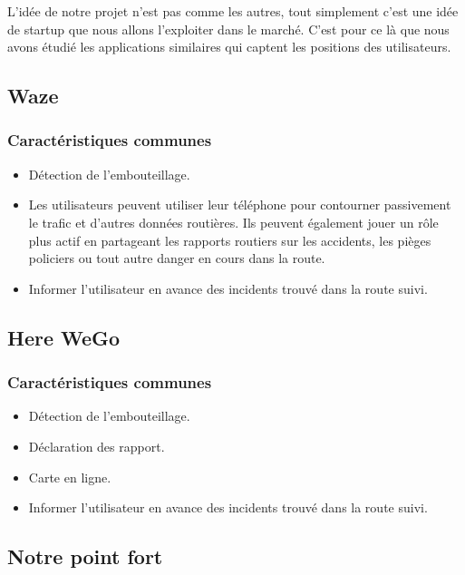 L'idée de notre projet n'est pas comme les autres, tout simplement c'est une
idée de startup que nous allons l'exploiter dans le marché. C'est pour ce là
que nous avons étudié les applications similaires qui captent les positions des
utilisateurs.

\subsection{Waze}

\subsubsection{Caractéristiques communes}

\begin{itemize}
    \item Détection de l'embouteillage.
    \item Les utilisateurs peuvent utiliser leur téléphone pour contourner
        passivement le trafic et d'autres données routières. Ils peuvent
        également jouer un rôle plus actif en partageant les rapports routiers
        sur les accidents, les pièges policiers ou tout autre danger en cours
        dans la route.
    \item Informer l'utilisateur en avance des incidents trouvé dans la route
        suivi.
\end{itemize}

\subsection{Here WeGo}

\subsubsection{Caractéristiques communes}

\begin{itemize}
 \item Détection de l'embouteillage.
 \item Déclaration des rapport.
 \item Carte en ligne.
 \item Informer l'utilisateur en avance des incidents trouvé dans la route
        suivi.
\end{itemize}

\subsection{Notre point fort}

